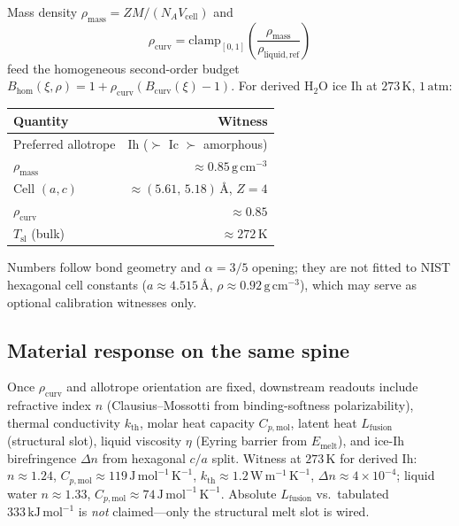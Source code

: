 \documentclass[11pt,a4paper]{article}
\theoremstyle{plain}
\theoremstyle{definition}
\theoremstyle{remark}
\theoremstyle{plain}
\theoremstyle{definition}
\begin{document}
Mass density $\rho_{\mathrm{mass}} = ZM/(N_A V_{\mathrm{cell}})$ and
\[
  \rho_{\mathrm{curv}} = \mathrm{clamp}_{[0,1]}\!\left(\frac{\rho_{\mathrm{mass}}}{\rho_{\mathrm{liquid,ref}}}\right)
\]
feed the homogeneous second-order budget
$B_{\mathrm{hom}}(\xi,\rho)=1+\rho_{\mathrm{curv}}(B_{\mathrm{curv}}(\xi)-1)$.
For derived $\mathrm{H_2O}$ ice Ih at $273\,\mathrm{K}$, $1\,\mathrm{atm}$:
\begin{center}
\begin{tabular}{@{}lr@{}}
\toprule
Quantity & Witness \\
\midrule
Preferred allotrope & Ih ($\succ$ Ic $\succ$ amorphous) \\
$\rho_{\mathrm{mass}}$ & $\approx 0.85\,\mathrm{g\,cm^{-3}}$ \\
Cell $(a,c)$ & $\approx (5.61,\,5.18)\,\text{\AA}$, $Z=4$ \\
$\rho_{\mathrm{curv}}$ & $\approx 0.85$ \\
$T_{\mathrm{sl}}$ (bulk) & $\approx 272\,\mathrm{K}$ \\
\bottomrule
\end{tabular}
\end{center}
Numbers follow bond geometry and $\alpha=3/5$ opening; they are not fitted to NIST hexagonal cell constants ($a\approx 4.515\,\text{\AA}$, $\rho\approx 0.92\,\mathrm{g\,cm^{-3}}$), which may serve as optional calibration witnesses only.

\subsection{Material response on the same spine}

Once $\rho_{\mathrm{curv}}$ and allotrope orientation are fixed, downstream readouts include refractive index $n$ (Clausius--Mossotti from binding-softness polarizability), thermal conductivity $k_{\mathrm{th}}$, molar heat capacity $C_{p,\mathrm{mol}}$, latent heat $L_{\mathrm{fusion}}$ (structural slot), liquid viscosity $\eta$ (Eyring barrier from $E_{\mathrm{melt}}$), and ice-Ih birefringence $\Delta n$ from hexagonal $c/a$ split.
Witness at $273\,\mathrm{K}$ for derived Ih: $n\approx 1.24$, $C_{p,\mathrm{mol}}\approx 119\,\mathrm{J\,mol^{-1}\,K^{-1}}$, $k_{\mathrm{th}}\approx 1.2\,\mathrm{W\,m^{-1}\,K^{-1}}$, $\Delta n\approx 4\times 10^{-4}$; liquid water $n\approx 1.33$, $C_{p,\mathrm{mol}}\approx 74\,\mathrm{J\,mol^{-1}\,K^{-1}}$.
Absolute $L_{\mathrm{fusion}}$ vs.\ tabulated $333\,\mathrm{kJ\,mol^{-1}}$ is \emph{not} claimed---only the structural melt slot is wired.
\end{document}
